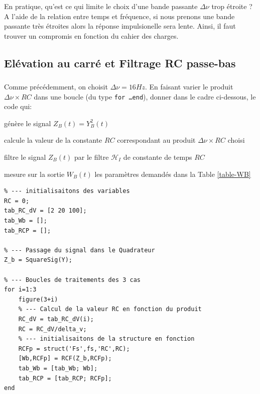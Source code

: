 \documentclass{article}
\newcommand{\dnu}{16}
\begin{document}
\subsubsection{}
En pratique, qu'est ce qui limite le choix d'une  bande passante $\Delta \nu$ trop étroite ?\\
\newline
A l'aide de la relation entre temps et fréquence, si nous prenons une bande passante très étroites alors la réponse impulsionelle sera lente. Ainsi, il faut trouver un compromis en fonction du cahier des charges.   

\newpage
\subsection{Elévation au carré et Filtrage RC passe-bas}
\subsubsection{}

Comme précédemment, on choisit $\Delta\nu = \dnu Hz$. En faisant varier le produit $\Delta \nu \times RC$ dans une boucle (du type {\tt for \ldots end}), donner dans le cadre ci-dessous, le code qui:

\begin{list}{-}{\setlength{\leftmargin}{3mm} \setlength{\labelwidth}{20mm} \setlength{\labelsep}{2mm} \setlength{\itemsep}{1mm} }
\item génère le signal $Z_B(t)= Y_B^2(t)$ 
\item calcule la valeur de la constante $RC$ correspondant au produit $\Delta\nu \times RC$ choisi
\item filtre le signal $Z_B(t)$ par le filtre $\mathcal{H}_{I}$ de constante de temps $RC$  
\item mesure sur la sortie $W_B(t)$ les paramètres demandés dans la  Table \ref{table-WB}
\end{list}

\begin{verbatim}
% --- initialisaitons des variables
RC = 0;
tab_RC_dV = [2 20 100];
tab_Wb = [];
tab_RCP = [];

% --- Passage du signal dans le Quadrateur
Z_b = SquareSig(Y);

% --- Boucles de traitements des 3 cas
for i=1:3
    figure(3+i)
    % --- Calcul de la valeur RC en fonction du produit
    RC_dV = tab_RC_dV(i);
    RC = RC_dV/delta_v;
    % --- initialisaitons de la structure en fonction
    RCFp = struct('Fs',fs,'RC',RC);
    [Wb,RCFp] = RCF(Z_b,RCFp);
    tab_Wb = [tab_Wb; Wb];
    tab_RCP = [tab_RCP; RCFp];
end
\end{verbatim}
\end{document}
